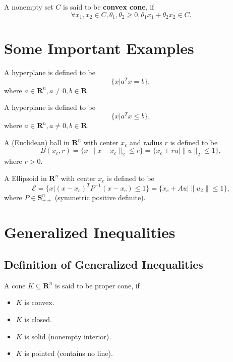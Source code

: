 \begin{definition}
	A nonempty set $C$ is said to be \textbf{convex cone}, if $$\forall x_1,x_2\in C, \theta_1,\theta_2\geq 0,\theta_1 x_1+\theta_2 x_2\in C.$$
\end{definition}

\section{Some Important Examples}

\begin{definition}[Hyperplane]
	A hyperplane is defined to be $$\{x|a^Tx=b\},$$ where $a\in\mathbf{R}^n,a\neq 0,b\in\mathbf{R}$.
\end{definition}

\begin{definition}[Halfspace]
	A hyperplane is defined to be $$\{x|a^Tx\leq b\},$$ where $a\in\mathbf{R}^n,a\neq 0,b\in\mathbf{R}$.
\end{definition}

\begin{definition}
	A (Euclidean) ball in $\mathbf{R}^n$ with center $x_c$ and radius $r$ is defined to be $$B(x_c,r)=\{x\vert\|x-x_c\|_2\leq r\}=\{x_c+ru\vert\|u\|_2\leq 1\},$$ where $r>0$.
\end{definition}

\begin{definition}[Ellipsoid]
	A Ellipsoid in $\mathbf{R}^n$ with center $x_c$ is defined to be $$\mathcal{E}=\{x\vert(x-x_c)^TP^{-1}(x-x_c)\leq 1\}=\{x_c+Au\vert \|u_2\|\leq 1\},$$ where $P\in\mathbf{S}^{n}_{++}$ (symmetric positive definite).
\end{definition}

\section{Generalized Inequalities}

\subsection{Definition of Generalized Inequalities}

\begin{definition} \label{def:proper-cone}
	A cone $K\subseteq\mathbf{R}^n$ is said to be proper cone, if
	\begin{itemize}
		\item $K$ is convex.
		\item $K$ is closed.
		\item $K$ is solid (nonempty interior).
		\item $K$ is pointed (contains no line).
	\end{itemize}
\end{definition}

